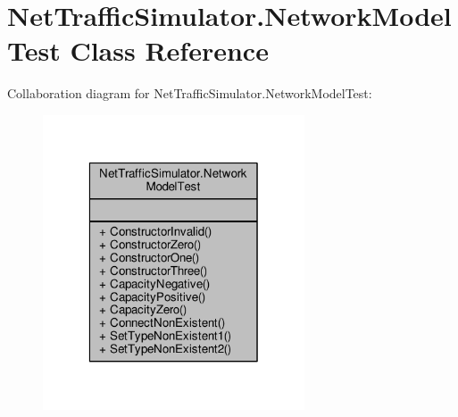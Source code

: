 \hypertarget{classNetTrafficSimulator_1_1NetworkModelTest}{\section{Net\-Traffic\-Simulator.\-Network\-Model\-Test Class Reference}
\label{classNetTrafficSimulator_1_1NetworkModelTest}
}


Collaboration diagram for Net\-Traffic\-Simulator.\-Network\-Model\-Test\-:
\nopagebreak
\begin{figure}[H]
\begin{center}
\leavevmode
\includegraphics[width=220pt]{classNetTrafficSimulator_1_1NetworkModelTest__coll__graph}
\end{center}
\end{figure}

